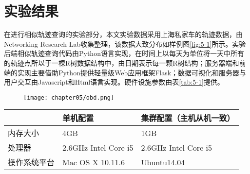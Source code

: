 
\chapter{实验结果}
\label{chap:experiment}
在进行相似轨迹查询的实验部分，本文实验数据采用上海私家车的轨迹数据，由Networking Research Lab收集整理，该数据大致分布如样例图\ref{fig:5-1}所示。实验后端相似轨迹查询代码由Python语言实现，在时间上以每天为单位将一天中所有的轨迹点所以于一棵R树数据结构中，由日期表示每一颗R树结构；服务器端和前端的实现主要借助Python提供轻量级Web应用框架Flask；数据可视化和服务器与用户交互由Javascript和Html语言实现。硬件设施参数由表\ref{tab:5-1}提供。

\begin{figure}[!htp]
  \centering
  \texttt{[image: chapter05/obd.png]}
\end{figure}

\begin{table}[!htpb]
  	\centering
		\begin{tabular}{ |p{3cm}|p{4.5cm}|p{4.5cm}| }
		\hline
		 & 单机配置 & 集群配置（主机从机一致） \\
		 \hline
		 内存大小 & 4GB & 1GB \\
		 \hline
		 处理器 & 2.6GHz Intel Core i5 & 2.6GHz Intel Core i5 \\
		 \hline 
		 操作系统平台 & Mac OS X 10.11.6 & Ubuntu14.04 \\
		 \hline 
		\end{tabular}
\end{table}


